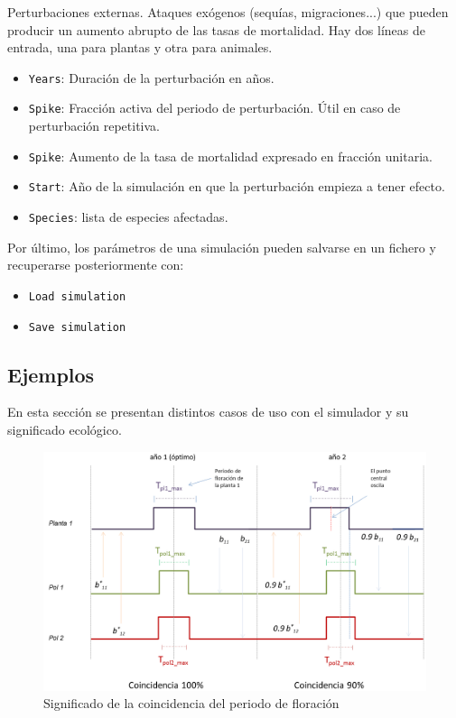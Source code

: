 Perturbaciones externas. Ataques exógenos (sequías, migraciones...) que pueden producir un aumento abrupto de las tasas
de mortalidad. Hay dos líneas de entrada, una para plantas y otra para animales.

\begin{itemize}
 \item \texttt{Years}: Duración de la perturbación en años.
 \item \texttt{Spike}: Fracción activa del periodo de perturbación. Útil en caso de perturbación repetitiva.
 \item \texttt{Spike}: Aumento de la tasa de mortalidad expresado en fracción unitaria.
 \item \texttt{Start}: Año de la simulación en que la perturbación empieza a tener efecto.
 \item \texttt{Species}: lista de especies afectadas.
\end{itemize}

Por último, los parámetros de una simulación pueden salvarse en un fichero y recuperarse posteriormente con:
\begin{itemize}
 \item \texttt{Load simulation}
 \item \texttt{Save simulation}
\end{itemize}

\subsection{Ejemplos}

En esta sección se presentan distintos casos de uso con el simulador y su significado ecológico.

\begin{figure}[h!]
\centering
\includegraphics[scale=1]{ManFigs/sigmund_tiempos.png}
\caption{Significado de la coincidencia del periodo de floración}
\label{fig:ASIGMUNDMAN_sigmund_tiempos}
\end{figure}

